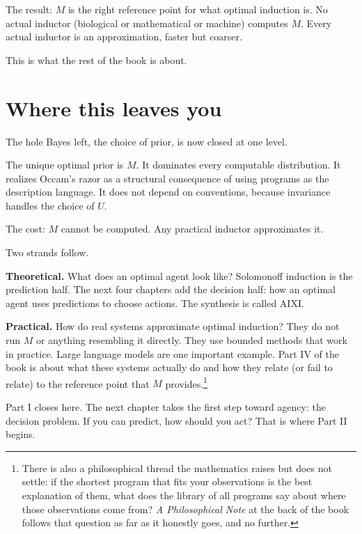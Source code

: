 The result: $M$ is the right reference point for what optimal induction is. No actual inductor (biological or mathematical or machine) computes $M$. Every actual inductor is an approximation, faster but coarser.

This is what the rest of the book is about.

\section*{Where this leaves you}

The hole Bayes left, the choice of prior, is now closed at one level.

The unique optimal prior is $M$. It dominates every computable distribution. It realizes Occam's razor as a structural consequence of using programs as the description language. It does not depend on conventions, because invariance handles the choice of $U$.

The cost: $M$ cannot be computed. Any practical inductor approximates it.

Two strands follow.

\textbf{Theoretical.} What does an optimal agent look like? Solomonoff induction is the prediction half. The next four chapters add the decision half: how an optimal agent uses predictions to choose actions. The synthesis is called AIXI.

\textbf{Practical.} How do real systems approximate optimal induction? They do not run $M$ or anything resembling it directly. They use bounded methods that work in practice. Large language models are one important example. Part IV of the book is about what these systems actually do and how they relate (or fail to relate) to the reference point that $M$ provides.\footnote{There is also a philosophical thread the mathematics raises but does not settle: if the shortest program that fits your observations is the best explanation of them, what does the library of all programs say about where those observations come from? \emph{A Philosophical Note} at the back of the book follows that question as far as it honestly goes, and no further.}

Part I closes here. The next chapter takes the first step toward agency: the decision problem. If you can predict, how should you act? That is where Part II begins.
